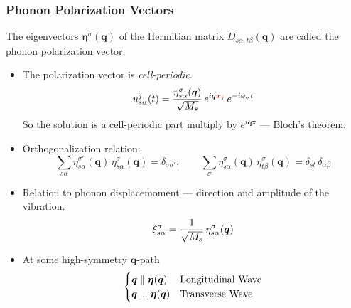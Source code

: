 \begin{frame}
  \frametitle{Phonon Polarization Vectors}

  The eigenvectors $\boldsymbol{\eta}^\sigma(\boldsymbol{q})$ of the Hermitian
  matrix $D_{s\alpha,t\beta}(\boldsymbol{q})$ are called the phonon polarization
  vector.

  \begin{itemize}
    \setlength\itemsep{\smallskipamount}
    
    \item The polarization vector is \emph{cell-periodic}.
    \begin{equation*}
        {u}_{s\alpha}^j(t) =
        {{\eta}^\sigma_{s\alpha}(\boldsymbol{q}) \over \sqrt{M_s}}\,
        e^{i\boldsymbol{q}\mathcolor{red}{\boldsymbol{x}_j}} \,e^{- i\omega_\sigma t}
    \end{equation*}
    So the solution is a cell-periodic part multiply by
    $e^{i\boldsymbol{q}\boldsymbol{x}}$ --- Bloch's theorem.

    \item Orthogonalization relation:
    \begin{equation*}
      \sum_{s\alpha}
      \eta^{\sigma'}_{s\alpha}(\boldsymbol{q})\,
      \eta^{\sigma}_{s\alpha}(\boldsymbol{q})
      = \delta_{\sigma\sigma'};
      \qquad
      \sum_{\sigma}
      \eta^{\sigma}_{s\alpha}(\boldsymbol{q})\,
      \eta^{\sigma}_{t\beta}(\boldsymbol{q})
      = \delta_{st} \, \delta_{\alpha\beta}
    \end{equation*}
    \item Relation to phonon displacemoment --- direction and amplitude of the vibration.
      \begin{equation*}
      \xi^{\sigma}_{s\alpha} = {1\over\sqrt{M_s}}\,\eta^{\sigma}_{s\alpha}(\boldsymbol{q})
      \end{equation*}
      
    \item At some high-symmetry $\boldsymbol{q}$-path
      \begin{equation*}
        \begin{cases}
          \boldsymbol{q} \parallel \boldsymbol{\eta}(\boldsymbol{q}) & \text{Longitudinal Wave} \cr
          \boldsymbol{q} \perp     \boldsymbol{\eta}(\boldsymbol{q}) & \text{Transverse Wave} \cr
        \end{cases}
      \end{equation*}
  \end{itemize}
\end{frame}

